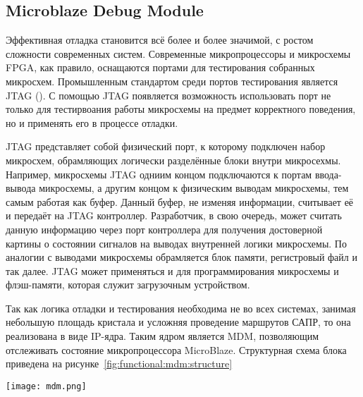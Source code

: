 \subsection{Microblaze Debug Module}
\label{sec:functional:mdm}

Эффективная отладка становится всё более и более значимой, с ростом сложности современных систем. Современные
микропроцессоры и микросхемы FPGA, как правило, оснащаются портами для тестирования собранных микросхем. Промышленным
стандартом среди портов тестирования является JTAG (). С помощью JTAG появляется возможность
использовать порт не только для тестирвоания работы микросхемы на предмет корректного поведения, но и применять
его в процессе отладки.

JTAG представляет собой физический порт, к которому подключен набор микросхем, обрамляющих
логически разделённые блоки внутри микросехмы. Например, микросхемы JTAG одниим концом подключаются к портам
ввода-вывода микросхемы, а другим концом к физическим выводам микросхемы, тем самым работая как буфер. Данный
буфер, не изменяя информации, считывает её и передаёт на JTAG контроллер. Разработчик, в свою очередь, может
считать данную информацию через порт контроллера для получения достоверной картины о состоянии сигналов
на выводах внутренней логики микросхемы. По аналогии с выводами микросхемы обрамляется блок памяти, регистровый
файл и так далее. JTAG может применяться и для программирования микросхемы и флэш-памяти, которая служит
загрузочным устройством.

Так как логика отладки и тестирования необходима не во всех системах, занимая небольшую площадь кристала
и усложняя проведение маршрутов САПР, то она реализована в виде IP-ядра. Таким ядром является MDM,
позволяющим отслеживать состояние  микропроцессора MicroBlaze. Структурная схема блока
приведена на рисунке~\ref{fig:functional:mdm:structure}

\begin{center}
  \centering
  \texttt{[image: mdm.png]}
  \label{fig:functional:mdm:structure}
\end{center}

